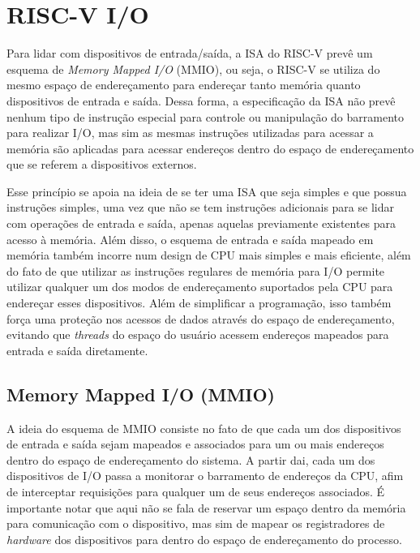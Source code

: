 
\section*{RISC-V I/O}

	Para lidar com dispositivos de entrada/saída, a ISA do RISC-V prevê um esquema de
	\textit{Memory Mapped I/O} (MMIO), ou seja, o RISC-V se utiliza do mesmo espaço de endereçamento
	para endereçar tanto memória quanto dispositivos de entrada e saída. Dessa forma, a
	especificação da ISA não prevê nenhum tipo de instrução especial para controle ou manipulação
	do barramento para realizar I/O, mas sim as mesmas instruções utilizadas para acessar a
	memória são aplicadas para acessar endereços dentro do espaço de endereçamento
	que se referem a dispositivos externos.

	Esse princípio se apoia na ideia de se ter uma ISA que seja simples e que possua instruções
	simples, uma vez que não se tem instruções adicionais para se lidar com operações de entrada
	e saída, apenas aquelas previamente existentes para acesso à memória. Além disso, o esquema
	de entrada e saída mapeado em memória também incorre num design de CPU mais simples e mais
	eficiente, além do fato de que utilizar as instruções regulares de memória para I/O permite
	utilizar qualquer um dos modos de endereçamento suportados pela CPU para endereçar
	esses dispositivos. Além de simplificar a programação, isso também força uma proteção nos
	acessos de dados através do espaço de endereçamento, evitando que \textit{threads} do espaço
	do usuário acessem endereços mapeados para entrada e saída diretamente.


	\subsection*{Memory Mapped I/O (MMIO)}
		A ideia do esquema de MMIO consiste no fato de que cada um dos dispositivos de entrada e
		saída sejam mapeados e associados para um ou mais endereços dentro do espaço de endereçamento do
		sistema. A partir dai, cada um dos dispositivos de I/O passa a monitorar o barramento de
		endereços da CPU, afim de interceptar requisições para qualquer um de seus endereços associados.
		É importante notar que aqui não se fala de reservar um espaço dentro da memória para comunicação
		com o dispositivo, mas sim de mapear os registradores de \textit{hardware} dos dispositivos para dentro
		do espaço de endereçamento do processo.

